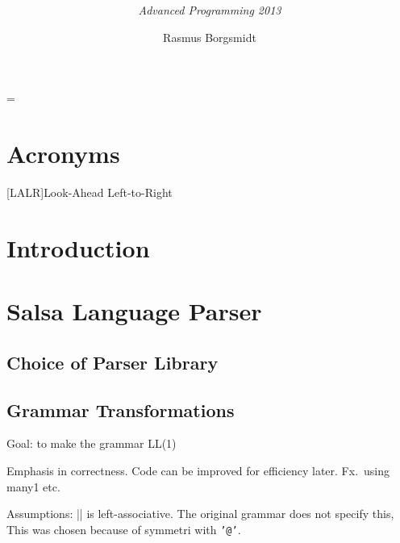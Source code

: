 \documentclass[
paper=a4,
oneside,
fontsize=11pt,
numbers=noenddot,
headinclude=false, %
footinclude=false, %
fleqn,             %
DIV=8
]{scrartcl}
\newcommand{\acrofont}[1]{\textrm{\textmd{#1}}}
\DeclareRobustCommand{\spacedlowsmallcaps}[1]{\MakeTextLowercase{\textsc{\lowsmallcapsspacing{#1}}}}%
\begin{document}
\title{\textcolor{spot}{\rmfamily\mdseries\spacedlowsmallcaps{Exam Report}}}
\subtitle{\rmfamily\mdseries\itshape\normalsize{Advanced Programming 2013}}
\author{\large Rasmus Borgsmidt}
\date{}
\maketitle
{}
\setcounter{tocdepth}{1} %
\manualmark
\vspace{-30pt}\tableofcontents
\vspace{30pt}

\font%
\font%
\font=\font%

\section*{Acronyms}
\begin{acronym}[DRY]
  [\acrofont{LALR}]{Look-Ahead Left-to-Right}
\end{acronym}

\section*{Introduction}

\section{Salsa Language Parser}

\subsection{Choice of Parser Library}

\subsection{Grammar Transformations}

Goal: to make the grammar LL(1)

Emphasis in correctness. Code can be improved for efficiency later. Fx.\ using
many1 etc.

Assumptions: || is left-associative. The original grammar does not specify this,
This was chosen because of symmetri with {\tt '@'}.
\end{document}
